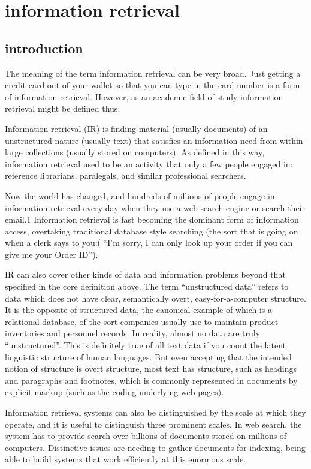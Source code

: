 \section{information retrieval}  

\subsection{introduction}


The meaning of the term information retrieval can be very broad. Just getting a credit card out of your wallet so that you can type in the card number is a form of information retrieval. However, as an academic field of study information retrieval might be defined thus: 

Information retrieval (IR) is finding material (usually documents) of an unstructured nature (usually text) that satisfies an information need from within large collections (usually stored on computers). As defined in this way, information retrieval used to be an activity that only a few people engaged in: reference librarians, paralegals, and similar professional searchers.

 Now the world has changed, and hundreds of millions of people engage in information retrieval every day when they use a web search engine or search their email.1 Information retrieval is fast becoming the dominant form of information access, overtaking traditional database style searching (the sort that is going on when a clerk says to you:( “I’m sorry, I can only look up your order if you can give me your Order ID”).
 
IR can also cover other kinds of data and information problems beyond that specified in the core definition above. The term “unstructured data” refers to data which does not have clear, semantically overt, easy-for-a-computer structure. It is the opposite of structured data, the canonical example of which is a relational database, of the sort companies usually use to maintain product inventories and personnel records. In reality, almost no data are truly “unstructured”. This is definitely true of all text data if you count the latent linguistic structure of human languages. But even accepting that the intended notion of structure is overt structure, most text has structure, such as headings and paragraphs and footnotes, which is commonly represented in documents by explicit markup (such as the coding underlying web pages).

Information retrieval systems can also be distinguished by the scale at
which they operate, and it is useful to distinguish three prominent scales.
In web search, the system has to provide search over billions of documents
stored on millions of computers. Distinctive issues are needing to gather
documents for indexing, being able to build systems that work efficiently
at this enormous scale.




